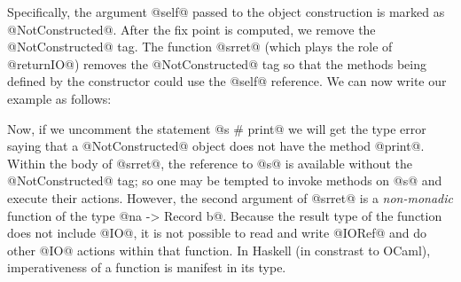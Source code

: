 \documentclass{jfp}
\begin{document}
Specifically, the argument @self@ passed to the object construction is
marked as @NotConstructed@. After the fix point is computed, we remove
the @NotConstructed@ tag. The function @srret@ (which plays the role
of @returnIO@) removes the @NotConstructed@ tag so that the methods
being defined by the constructor could use the @self@ reference. We
can now write our example as follows:




Now, if we uncomment the statement @s # print@ we will get the type
error saying that a @NotConstructed@ object does not have the method
@print@. Within the body of @srret@, the reference to @s@ is available
without the @NotConstructed@ tag; so one may be tempted to invoke
methods on @s@ and execute their actions. However, the second
argument of @srret@ is a \emph{non-monadic} function of the type
@na -> Record b@. Because the result type of the function does not include
@IO@, it is not possible to read and write @IORef@ and do other @IO@
actions within that function. In Haskell (in constrast to OCaml),
imperativeness of a function is manifest in its type.

\end{document}
